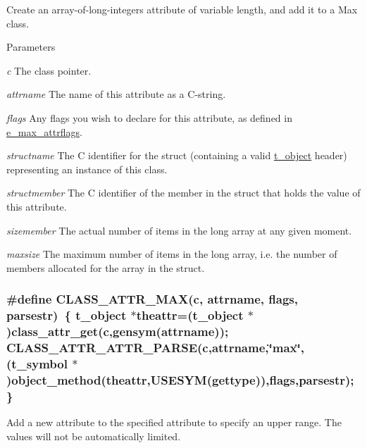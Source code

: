 Create an array-\/of-\/long-\/integers attribute of variable length, and add it to a Max class. 
\begin{DoxyParams}{Parameters}
\item[{\em c}]The class pointer. \item[{\em attrname}]The name of this attribute as a C-\/string. \item[{\em flags}]Any flags you wish to declare for this attribute, as defined in \hyperlink{group__attr_gaf296cfc6741bb19207f6ed8062809115}{e\_\-max\_\-attrflags}. \item[{\em structname}]The C identifier for the struct (containing a valid \hyperlink{structt__object}{t\_\-object} header) representing an instance of this class. \item[{\em structmember}]The C identifier of the member in the struct that holds the value of this attribute. \item[{\em sizemember}]The actual number of items in the long array at any given moment. \item[{\em maxsize}]The maximum number of items in the long array, i.e. the number of members allocated for the array in the struct. \end{DoxyParams}
\hypertarget{group__attr_ga80157be7023be017f33e5c80b6f845d6}{
\subsubsection[{CLASS\_\-ATTR\_\-MAX}]{\setlength{\rightskip}{0pt plus 5cm}\#define CLASS\_\-ATTR\_\-MAX(c, \/  attrname, \/  flags, \/  parsestr)~\{ {\bf t\_\-object} $\ast$theattr=({\bf t\_\-object} $\ast$)class\_\-attr\_\-get(c,gensym(attrname)); CLASS\_\-ATTR\_\-ATTR\_\-PARSE(c,attrname,\char`\"{}max\char`\"{},(t\_\-symbol $\ast$)object\_\-method(theattr,USESYM(gettype)),flags,parsestr); \}}}
\label{group__attr_ga80157be7023be017f33e5c80b6f845d6}


Add a new attribute to the specified attribute to specify an upper range. The values will not be automatically limited.


